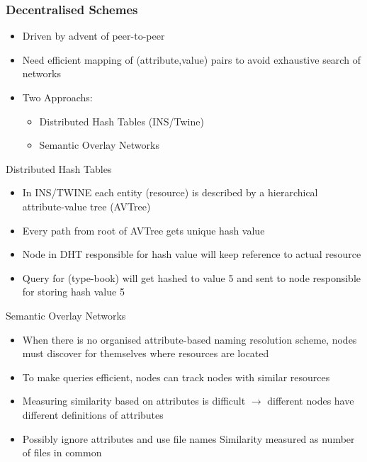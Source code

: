 \subsubsection{Decentralised Schemes}
\begin{itemize}
	\item Driven by advent of peer-to-peer
	\item Need efficient mapping of (attribute,value) pairs to avoid exhaustive search of networks
	\item Two Approachs:
	\begin{itemize}
		\item Distributed Hash Tables (INS/Twine)
		\item Semantic Overlay Networks
	\end{itemize}
\end{itemize}

\begin{note}{Distributed Hash Tables}
	\begin{itemize}
		\item In INS/TWINE each entity (resource) is described by a hierarchical attribute-value tree (AVTree)
		\item Every path from root of AVTree gets unique hash value
		\item Node in DHT responsible for hash value will keep reference to actual resource
		\item Query for (type-book) will get hashed to value 5 and sent to node responsible for storing hash value 5
	\end{itemize}
\end{note}

\begin{note}{Semantic Overlay Networks}
	\begin{itemize}
		\item When there is no organised attribute-based naming resolution scheme, nodes must discover for themselves where resources are located
		\item To make queries efficient, nodes can track nodes with similar resources
		\item Measuring similarity based on attributes is difficult $\rightarrow$ different nodes have different definitions of attributes
		\item Possibly ignore attributes and use file names
		\subitem Similarity measured as number of files in common	
	\end{itemize}
\end{note}

